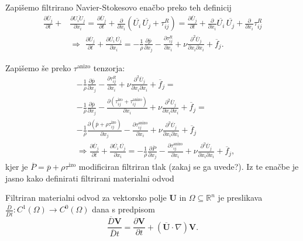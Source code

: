 \documentclass[mat2, tisk]{fmfdelo}
\newcommand{\R}{\mathbb R}
\newcommand{\bd}{\textbf}
\begin{document}
Zapišemo filtrirano Navier-Stokesovo enačbo preko teh definicij
\begin{align*}
\frac{\partial \overline{U}_j}{\partial t} + &\frac{\partial \overline{U_i U_j}}{\partial x_i} = 
\frac{\partial \overline{U}_j}{\partial t} + \frac{\partial}{\partial x_i} (\overline{U_i}\, \overline{U_j} + \tau_{ij}^R) = 
\frac{\partial \overline{U}_j}{\partial t} + \frac{\partial}{\partial x_i} \overline{U_i}\, \overline{U_j} + \frac{\partial}{\partial x_i} \tau_{ij}^R\\[2mm]
&\Longrightarrow \,\,
\frac{\partial \overline{U}_j}{\partial t} + \frac{\partial \overline{U_i}\, \overline{U_j}}{\partial x_i} = -\frac{1}{\rho} \frac{\partial \overline{p}}{\partial x_j} 
- \frac{\partial \tau_{ij}^R}{\partial x_i}+ \nu \frac{\partial^2 \overline{U}_j}{\partial x_i \partial x_i} + \overline{f}_j.
\end{align*}

Zapišemo še preko $\tau^\text{anizo}$ tenzorja:
\begin{align*}
&-\frac{1}{\rho} \frac{\partial \overline{p}}{\partial x_j} - \frac{\partial \tau_{ij}^R}{\partial x_i}+ \nu \frac{\partial^2 \overline{U}_j}{\partial x_i \partial x_i} + \overline{f}_j = \\[1mm]
&-\frac{1}{\rho} \frac{\partial \overline{p}}{\partial x_j} - \frac{\partial (\tau^\text{izo}_{ij} + \tau^\text{anizo}_{ij}) }{\partial x_i}+ \nu \frac{\partial^2 \overline{U}_j}{\partial x_i \partial x_i} + \overline{f}_j = \\[1mm]
&-\frac{1}{\rho} \frac{\partial (\overline{p} + \rho\tau^\text{izo}_{ij})}{\partial x_j} - \frac{\partial \tau^\text{anizo}_{ij} }{\partial x_i}+ \nu \frac{\partial^2 \overline{U}_j}{\partial x_i \partial x_i} + \overline{f}_j \\[2mm]
&\Longrightarrow 
\frac{\partial \overline{U}_j}{\partial t} + \frac{\partial \overline{U_i}\, \overline{U_j}}{\partial x_i} = -\frac{1}{\rho} \frac{\partial \overline{P}}{\partial x_j} 
- \frac{\partial \tau_{ij}^\text{anizo}}{\partial x_i}+ \nu \frac{\partial^2 \overline{U}_j}{\partial x_i \partial x_i} + \overline{f}_j,
\end{align*}
kjer je $\overline{P} = \overline{p} + \rho\tau^\text{izo}$ modificiran filtriran tlak 
(zakaj se ga uvede?). Iz te enačbe je jasno kako definirati filtrirani materialni odvod 
\begin{definicija}
Filtriran materialni odvod za vektorsko polje $\bd{U}$ in $\Omega \subseteq \R^n$ je preslikava 
$\frac{\overline{D}}{\overline{D}t}: C^1(\Omega) \rightarrow C^0(\Omega)$ dana s predpisom
\begin{equation}
\frac{\overline{D} \bd{V}}{\overline{D}t} = \frac{\partial \bd{V}}{\partial t} + (\overline{\bd{U}}\cdot \nabla)\bd{V}.
\end{equation}
\end{definicija}
\end{document}
